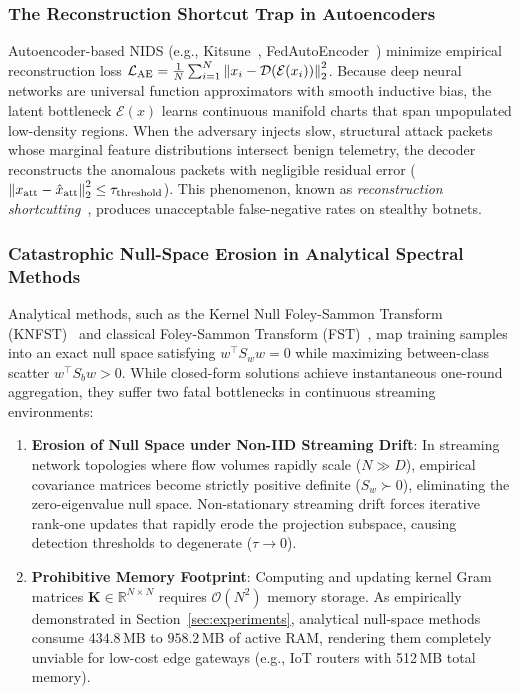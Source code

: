 \subsubsection{The Reconstruction Shortcut Trap in Autoencoders}
Autoencoder-based NIDS (e.g., Kitsune~\cite{mirsky2018kitsune}, FedAutoEncoder~\cite{sakurada2014anomaly}) minimize empirical reconstruction loss $\mathcal{L}_{\text{AE}} = \frac{1}{N}\sum_{i=1}^N \left\lVert x_i - \mathcal{D}(\mathcal{E}(x_i))\right\rVert_2^2$. Because deep neural networks are universal function approximators with smooth inductive bias, the latent bottleneck $\mathcal{E}(x)$ learns continuous manifold charts that span unpopulated low-density regions. When the adversary injects slow, structural attack packets whose marginal feature distributions intersect benign telemetry, the decoder reconstructs the anomalous packets with negligible residual error ($\left\lVert x_{\text{att}} - \hat{x}_{\text{att}}\right\rVert_2^2 \le \tau_{\text{threshold}}$). This phenomenon, known as \emph{reconstruction shortcutting}~\cite{gong2019memorizing}, produces unacceptable false-negative rates on stealthy botnets.

\subsubsection{Catastrophic Null-Space Erosion in Analytical Spectral Methods}
Analytical methods, such as the Kernel Null Foley-Sammon Transform (KNFST)~\cite{bodesheim2013kernel} and classical Foley-Sammon Transform (FST)~\cite{foley1975optimal}, map training samples into an exact null space satisfying $w^\top S_w w = 0$ while maximizing between-class scatter $w^\top S_b w > 0$. While closed-form solutions achieve instantaneous one-round aggregation, they suffer two fatal bottlenecks in continuous streaming environments:
\begin{enumerate}
    \item \textbf{Erosion of Null Space under Non-IID Streaming Drift}: In streaming network topologies where flow volumes rapidly scale ($N \gg D$), empirical covariance matrices become strictly positive definite ($S_w \succ 0$), eliminating the zero-eigenvalue null space. Non-stationary streaming drift forces iterative rank-one updates that rapidly erode the projection subspace, causing detection thresholds to degenerate ($\tau \to 0$).
    \item \textbf{Prohibitive Memory Footprint}: Computing and updating kernel Gram matrices $\mathbf{K} \in \mathbb{R}^{N \times N}$ requires $\mathcal{O}(N^2)$ memory storage. As empirically demonstrated in Section~\ref{sec:experiments}, analytical null-space methods consume $434.8$\,MB to $958.2$\,MB of active RAM, rendering them completely unviable for low-cost edge gateways (e.g., IoT routers with 512\,MB total memory).
\end{enumerate}

